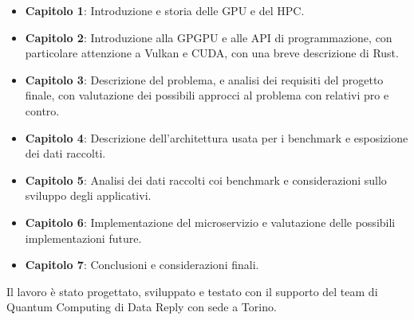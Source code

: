 \begin{itemize}
    \item \textbf{Capitolo 1}: Introduzione e storia delle \gls{GPU} e del \gls{HPC}.
    \item \textbf{Capitolo 2}: Introduzione alla \gls{GPGPU} e alle \gls{API} di programmazione, con particolare attenzione a Vulkan e \gls{CUDA}, con una breve descrizione di Rust.
    \item \textbf{Capitolo 3}: Descrizione del problema, e analisi dei requisiti del progetto finale, con valutazione dei possibili approcci al problema con relativi pro e contro.
    \item \textbf{Capitolo 4}: Descrizione dell'architettura usata per i benchmark e esposizione dei dati raccolti.
    \item \textbf{Capitolo 5}: Analisi dei dati raccolti coi benchmark e considerazioni sullo sviluppo degli applicativi.
    \item \textbf{Capitolo 6}: Implementazione del microservizio e valutazione delle possibili implementazioni future.
    \item \textbf{Capitolo 7}: Conclusioni e considerazioni finali.
\end{itemize}

Il lavoro è stato progettato, sviluppato e testato con il supporto del team di Quantum Computing di Data Reply con sede a Torino.

